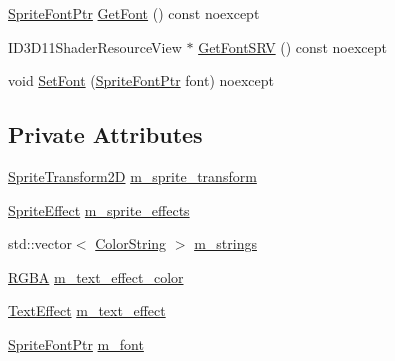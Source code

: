 \begin{DoxyCompactItemize}
\item 
\mbox{\hyperlink{namespacemage_1_1rendering_ab2f34196c20422ca3692ad3f3bff3a5d}{Sprite\+Font\+Ptr}} \mbox{\hyperlink{classmage_1_1rendering_1_1_sprite_text_a4ec33c106762e7f8d4d04cde0bf03669}{Get\+Font}} () const noexcept
\item 
I\+D3\+D11\+Shader\+Resource\+View $\ast$ \mbox{\hyperlink{classmage_1_1rendering_1_1_sprite_text_af9e6eb6e62d9c638dc86a7a978524aa9}{Get\+Font\+S\+RV}} () const noexcept
\item 
void \mbox{\hyperlink{classmage_1_1rendering_1_1_sprite_text_acad93e0803d47502db5ef16998d2f38a}{Set\+Font}} (\mbox{\hyperlink{namespacemage_1_1rendering_ab2f34196c20422ca3692ad3f3bff3a5d}{Sprite\+Font\+Ptr}} font) noexcept
\end{DoxyCompactItemize}
\subsection*{Private Attributes}
\begin{DoxyCompactItemize}
\item 
\mbox{\hyperlink{classmage_1_1_sprite_transform2_d}{Sprite\+Transform2D}} \mbox{\hyperlink{classmage_1_1rendering_1_1_sprite_text_a28d1c790a6a4d92c1e11a8bc48bc04ef}{m\+\_\+sprite\+\_\+transform}}
\item 
\mbox{\hyperlink{namespacemage_1_1rendering_a4dbc3536c87b906f1d41d863ec458e78}{Sprite\+Effect}} \mbox{\hyperlink{classmage_1_1rendering_1_1_sprite_text_a49995d4b435446b48d2d112113834f23}{m\+\_\+sprite\+\_\+effects}}
\item 
std\+::vector$<$ \mbox{\hyperlink{classmage_1_1rendering_1_1_color_string}{Color\+String}} $>$ \mbox{\hyperlink{classmage_1_1rendering_1_1_sprite_text_a2f9d4a00ad08710fe36eebd825b2f142}{m\+\_\+strings}}
\item 
\mbox{\hyperlink{structmage_1_1_r_g_b_a}{R\+G\+BA}} \mbox{\hyperlink{classmage_1_1rendering_1_1_sprite_text_a2fffa5ce343b92f32cbfe5234b182247}{m\+\_\+text\+\_\+effect\+\_\+color}}
\item 
\mbox{\hyperlink{classmage_1_1rendering_1_1_sprite_text_af07ecf28d2ab8997c011cab74e799ef7}{Text\+Effect}} \mbox{\hyperlink{classmage_1_1rendering_1_1_sprite_text_a795a35dc3671097dd29afaa4b2c5ac3a}{m\+\_\+text\+\_\+effect}}
\item 
\mbox{\hyperlink{namespacemage_1_1rendering_ab2f34196c20422ca3692ad3f3bff3a5d}{Sprite\+Font\+Ptr}} \mbox{\hyperlink{classmage_1_1rendering_1_1_sprite_text_ad682901cbe866d2dc316bf3238812d25}{m\+\_\+font}}
\end{DoxyCompactItemize}
